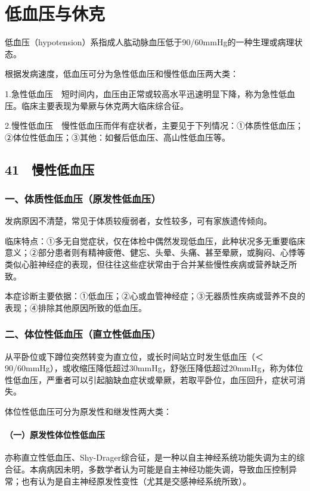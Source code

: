 \chapter{低血压与休克}

低血压（hypotension）系指成人肱动脉血压低于90/60mmHg的一种生理或病理状态。

根据发病速度，低血压可分为急性低血压和慢性低血压两大类：

1.急性低血压　短时间内，血压由正常或较高水平迅速明显下降，称为急性低血压。临床主要表现为晕厥与休克两大临床综合征。

2.慢性低血压　慢性低血压而伴有症状者，主要见于下列情况：①体质性低血压；②体位性低血压；③其他：如餐后低血压、高山性低血压等。

\section{41　慢性低血压}

\subsection{一、体质性低血压（原发性低血压）}

发病原因不清楚，常见于体质较瘦弱者，女性较多，可有家族遗传倾向。

临床特点：①多无自觉症状，仅在体检中偶然发现低血压，此种状况多无重要临床意义；②部分患者则有精神疲倦、健忘、头晕、头痛、甚至晕厥，或胸闷、心悸等类似心脏神经症的表现，但往往这些症状常由于合并某些慢性疾病或营养缺乏所致。

本症诊断主要依据：①低血压；②心或血管神经症；③无器质性疾病或营养不良的表现；④排除其他原因所致的低血压。

\subsection{二、体位性低血压（直立性低血压）}

从平卧位或下蹲位突然转变为直立位，或长时间站立时发生低血压（＜90/60mmHg），或收缩压降低超过30mmHg，舒张压降低超过20mmHg，称为体位性低血压，严重者可以引起脑缺血症状或晕厥，若取平卧位，血压回升，症状可消失。

体位性低血压可分为原发性和继发性两大类：

\subsubsection{（一）原发性体位性低血压}

亦称直立性低血压、Shy-Drager综合征，是一种以自主神经系统功能失调为主的综合征。本病病因未明，多数学者认为可能是自主神经功能失调，导致血压控制异常；也有认为是自主神经原发性变性（尤其是交感神经系统所致）。

